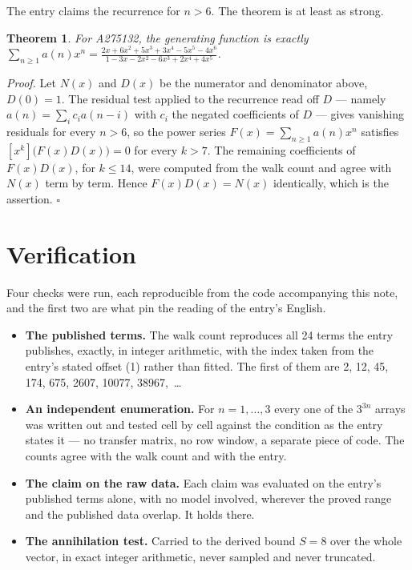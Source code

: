 \documentclass[11pt]{article}
\newtheorem{theorem}{Theorem}
\theoremstyle{definition}
\begin{document}
The entry claims the recurrence for $n > 6$. The theorem is at least as strong.

\begin{theorem} For A275132, the generating function is exactly $\sum_{n\ge 1} a(n)x^n = \frac{2x + 6x^{2} + 5x^{3} + 3x^{4} - 5x^{5} - 4x^{6}}{1 - 3x - 2x^{2} - 6x^{3} + 2x^{4} + 4x^{5}}$.\end{theorem}

{\itshape Proof.} Let $N(x)$ and $D(x)$ be the numerator and denominator above, $D(0)=1$. The residual test applied to the recurrence read off $D$ --- namely $a(n) = \sum_i c_i a(n-i)$ with $c_i$ the negated coefficients of $D$ --- gives vanishing residuals for every $n > 6$, so the power series $F(x)=\sum_{n\ge 1}a(n)x^n$ satisfies $[x^k]\bigl(F(x)D(x)\bigr) = 0$ for every $k > 7$. The remaining coefficients of $F(x)D(x)$, for $k \le 14$, were computed from the walk count and agree with $N(x)$ term by term. Hence $F(x)D(x) = N(x)$ identically, which is the assertion. $\square$

\section{Verification}

Four checks were run, each reproducible from the code accompanying this note, and the first two are what pin the reading of the entry's English.

\begin{itemize}

\item {\bfseries The published terms.} The walk count reproduces all 24 terms the entry publishes, exactly, in integer arithmetic, with the index taken from the entry's stated offset (1) rather than fitted. The first of them are 2, 12, 45, 174, 675, 2607, 10077, 38967,~\dots

\item {\bfseries An independent enumeration.} For $n = 1,\dots,3$ every one of the $3^{3n}$ arrays was written out and tested cell by cell against the condition as the entry states it --- no transfer matrix, no row window, a separate piece of code. The counts agree with the walk count and with the entry.

\item {\bfseries The claim on the raw data.} Each claim was evaluated on the entry's published terms alone, with no model involved, wherever the proved range and the published data overlap. It holds there.

\item {\bfseries The annihilation test.} Carried to the derived bound $S = 8$ over the whole vector, in exact integer arithmetic, never sampled and never truncated.

\end{itemize}
\end{document}
